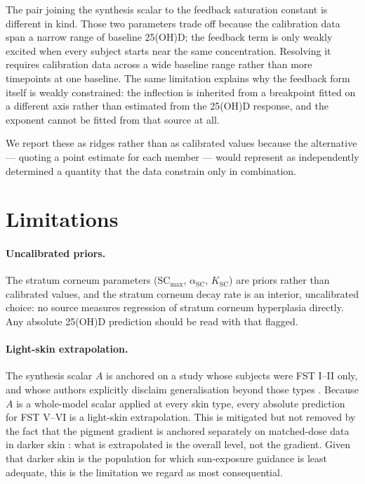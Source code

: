 \documentclass[11pt]{article}
\begin{document}
The pair joining the synthesis scalar to the feedback saturation
constant is different in kind. Those two parameters trade off because
the calibration data span a narrow range of baseline 25(OH)D; the
feedback term is only weakly excited when every subject starts near
the same concentration. Resolving it requires calibration data across
a wide baseline range rather than more timepoints at one baseline. The
same limitation explains why the feedback form itself is weakly
constrained: the inflection is inherited from a breakpoint fitted on a
different axis \citep{scholze2026} rather than estimated from the
25(OH)D response, and the exponent cannot be fitted from that source
at all.

We report these as ridges rather than as calibrated values because the
alternative --- quoting a point estimate for each member --- would
represent as independently determined a quantity that the data
constrain only in combination.

\section{Limitations}

\paragraph{Uncalibrated priors.} The stratum corneum parameters
($\mathrm{SC}_{\max}$, $\alpha_{\mathrm{SC}}$, $K_{\mathrm{SC}}$) are
priors rather than calibrated values, and the stratum corneum decay
rate is an interior, uncalibrated choice: no source measures
regression of stratum corneum hyperplasia directly. Any absolute
25(OH)D prediction should be read with that flagged.

\paragraph{Light-skin extrapolation.} The synthesis scalar $A$ is
anchored on a study whose subjects were FST I--II only, and whose
authors explicitly disclaim generalisation beyond those types
\citep{young2021pnas}. Because $A$ is a whole-model scalar applied at
every skin type, every absolute prediction for FST V--VI is a
light-skin extrapolation. This is mitigated but not removed by the
fact that the pigment gradient is anchored separately on matched-dose
data in darker skin \citep{young2020,farrar2013,felton2016,kift2013}:
what is extrapolated is the overall level, not the gradient. Given
that darker skin is the population for which sun-exposure guidance is
least adequate, this is the limitation we regard as most consequential.
\end{document}
